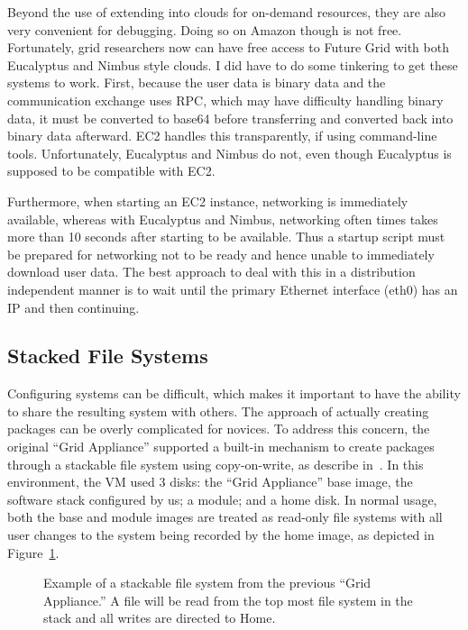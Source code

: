 Beyond the use of extending into clouds for on-demand resources, they are also
very convenient for debugging.  Doing so on Amazon though is not free.
Fortunately, grid researchers now can have free access to Future Grid with both
Eucalyptus and Nimbus style clouds.  I did have to do some tinkering to get
these systems to work.  First, because the user data is binary data and the
communication exchange uses RPC, which may have difficulty handling binary
data, it must be converted to base64 before transferring and converted back
into binary data afterward.  EC2 handles this transparently, if using
command-line tools.  Unfortunately, Eucalyptus and Nimbus do not, even though
Eucalyptus is supposed to be compatible with EC2.

Furthermore, when starting an EC2 instance, networking is immediately
available, whereas with Eucalyptus and Nimbus, networking often times takes
more than 10 seconds after starting to be available. Thus a startup script must
be prepared for networking not to be ready and hence unable to immediately
download user data.  The best approach to deal with this in a distribution
independent manner is to wait until the primary Ethernet interface (eth0) has
an IP and then continuing.

\subsection{Stacked File Systems}

Configuring systems can be difficult, which makes it important to have the
ability to share the resulting system with others.  The approach of actually
creating packages can be overly complicated for novices.  To address this
concern, the original ``Grid Appliance'' supported a built-in mechanism to
create packages through a stackable file system using copy-on-write, as
describe in~\cite{vtdc}.  In this environment, the VM used 3 disks: the ``Grid
Appliance'' base image, the software stack configured by us; a module; and a
home disk.  In normal usage, both the base and module images are treated as
read-only file systems with all user changes to the system being recorded by
the home image, as depicted in Figure~\ref{fig:stackfs}.

\begin{figure}
\centering
{}
\caption[Grid Appliance stackable file system]{Example of a stackable file
system from the previous ``Grid Appliance.''  A file will be read from the top
most file system in the stack and all writes are directed to Home.}
\label{fig:stackfs}
\end{figure}

